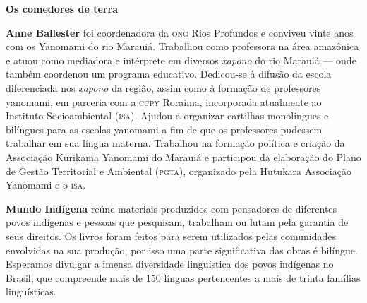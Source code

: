 \textbf{Os comedores de terra} 

\textbf{Anne Ballester} foi coordenadora da \textsc{ong} Rios Profundos e conviveu vinte anos com os Yanomami do rio Marauiá. Trabalhou como professora na área amazônica e atuou como mediadora e intérprete em diversos \textit{xapono} do rio Marauiá --- onde também coordenou um programa educativo. Dedicou-se à difusão da escola diferenciada nos \textit{xapono} da região, assim como à formação de professores yanomami, em parceria com a \textsc{ccpy} Roraima, incorporada atualmente ao Instituto Socioambiental (\textsc{isa}). Ajudou a organizar cartilhas monolíngues e bilíngues para as escolas yanomami a fim de que os professores pudessem trabalhar em sua língua materna. Trabalhou na formação política e criação da Associação Kurikama Yanomami do Marauiá e participou da elaboração do Plano de Gestão Territorial e Ambiental (\textsc{pgta}), organizado pela Hutukara Associação Yanomami e o \textsc{isa}.

\textbf{Mundo Indígena} reúne materiais produzidos com pensadores de diferentes povos indígenas e pessoas que pesquisam, trabalham ou lutam pela garantia de seus direitos. Os livros foram feitos para serem utilizados pelas comunidades envolvidas na sua produção, por isso uma parte significativa das obras é bilíngue. Esperamos divulgar a imensa diversidade linguística dos povos indígenas no Brasil, que compreende mais de 150 línguas pertencentes a mais de trinta famílias linguísticas.



